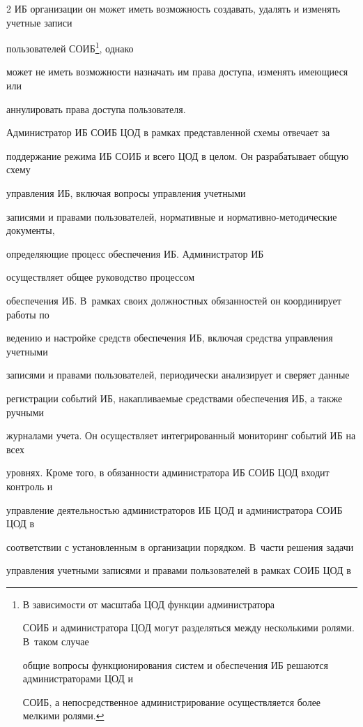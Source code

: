 \begin{multicols}{2}
ИБ организации он может иметь возможность создавать, удалять и изменять учетные записи 


пользователей СОИБ\footnote{В зависимости от масштаба ЦОД функции администратора 


СОИБ и администратора ЦОД могут разделяться между несколькими ролями. В~таком случае 


общие вопросы функционирования сис\-тем и обеспечения ИБ решаются администраторами ЦОД и 


СОИБ, а непосредственное администрирование осуществляется более мелкими ролями.}, однако 


может не иметь возможности назначать им права доступа, изменять имеющиеся или 


аннулировать права доступа пользователя.


       


       Администратор ИБ СОИБ ЦОД в рамках представленной схемы отвечает за 


поддержание режима ИБ СОИБ и всего ЦОД в целом. Он разрабатывает общую схему 


управления ИБ, включая вопросы управления учетными 


записями и правами пользователей, нормативные и нор\-ма\-тив\-но-ме\-то\-ди\-че\-ские документы, 


определяющие процесс обеспечения ИБ. Администратор ИБ


осуществляет общее руководство процессом 


обеспечения ИБ. В~рамках своих должностных обязанностей он координирует работы по 


ведению и настройке средств обеспечения ИБ, включая средства управления учетными 


записями и правами пользователей, периодически анализирует и сверяет данные 


регистрации событий ИБ, накапливаемые средствами обеспечения ИБ, а также ручными 


журналами учета. Он осуществляет интегрированный мониторинг событий ИБ на всех 


уровнях. Кроме того, в обязанности администратора ИБ СОИБ ЦОД входит контроль и 


управление деятельностью администраторов ИБ ЦОД и администратора СОИБ ЦОД в 


соответствии с уста\-нов\-лен\-ным в организации порядком. В~час\-ти решения задачи 


управления учетными записями и правами пользователей в рамках СОИБ ЦОД в 



\end{multicols}
